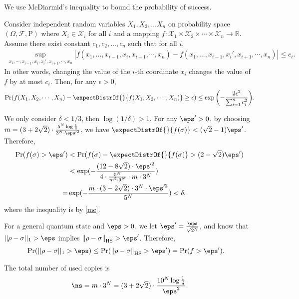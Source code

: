 We use McDiarmid's inequality to bound the probability of success.
\begin{lemma}\label{mc}
Consider independent random variables ${\displaystyle X_{1},X_{2},\dots X_{n}}$ on probability space $ {\displaystyle (\Omega ,{\mathcal {F}},{\text{P}})}$ where ${\displaystyle X_{i}\in {\mathcal {X}}_{i}}$ for all ${\displaystyle i}$ and a mapping ${\displaystyle f:{\mathcal {X}}_{1}\times {\mathcal {X}}_{2}\times \cdots \times {\mathcal {X}}_{n}\rightarrow \mathbb {R} }$. Assume there exist constant $ {\displaystyle c_{1},c_{2},\dots ,c_{n}} $ such that for all $ {\displaystyle i}$,
\begin{align}{\displaystyle {\underset {x_{1},\cdots ,x_{i-1},x_{i},x_{i}',x_{i+1},\cdots ,x_{n}}{\sup }}|f(x_{1},\dots ,x_{i-1},x_{i},x_{i+1},\cdots ,x_{n})-f(x_{1},\dots ,x_{i-1},x_{i}',x_{i+1},\cdots ,x_{n})|\leq c_{i}.} 
\end{align}
In other words, changing the value of the ${\displaystyle i}$-th coordinate ${\displaystyle x_{i}}$ changes the value of ${\displaystyle f}$ by at most ${\displaystyle c_{i}}$. Then, for any ${\displaystyle \epsilon >0}$,
\begin{align} 
{\displaystyle {\mathrm{Pr}}(f(X_{1},X_{2},\cdots ,X_{n})-\expectDistrOf{}{f(X_{1},X_{2},\cdots ,X_{n})}\geq \epsilon )\leq \exp \left(-{\frac {2\epsilon ^{2}}{\sum _{i=1}^{n}c_{i}^{2}}}\right)} .
\end{align}
\end{lemma}
We only consider $\delta<1/3$, then $\log(1/\delta)>1$.
For any $\eps'>0$, by choosing $m=(3+2\sqrt{2})\cdot\frac{5^N\log\frac{1}{\delta}}{3^N\cdot \eps'^2}$, we have $\expectDistrOf{}{f(\sigma)}< (\sqrt{2}-1){\eps'}$.
Therefore,
\begin{align*}
\mathrm{Pr}(f(\sigma) > \eps') &< \mathrm{Pr}(f(\sigma)-\expectDistrOf{}{f(\sigma)}>(2-\sqrt{2}){\eps'}) \\
&<\exp(-\frac{(12-8\sqrt{2})\cdot \eps'^2}{4\cdot \frac{5^N}{m^2\cdot 9^N}\cdot m\cdot 3^N}) \\
=& \exp(-\frac{m\cdot(3-2\sqrt{2})\cdot 3^N\cdot\eps'^2}{5^N}) <\delta, 
\end{align*}
where the inequality is by \cref{mc}.

For a general quantum state and $\eps>0$, we let $\eps'=\frac{\eps}{\sqrt{2^N}}$, and know that
$||\rho-\sigma||_1>\eps$ implies $\hsnorm{\rho-\sigma}>\eps'$. Therefore,
\begin{align*}
\mathrm{Pr}(||\rho-\sigma||_1>\eps) &\leq \mathrm{Pr}(\hsnorm{\rho-\sigma}>\eps')=\mathrm{Pr}(f>\eps').
\end{align*}

The total number of used copies is 
\begin{align*}
\ns = m\cdot 3^N=(3+2\sqrt{2})\cdot\frac{10^N\log\frac{1}{\delta}}{\eps^2}.
\end{align*}


